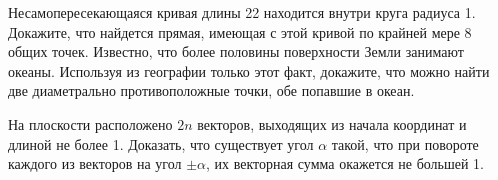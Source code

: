 \begin{problem}
Несамопересекающаяся кривая длины 22 находится внутри круга радиуса 1. Докажите, что найдется прямая, имеющая с этой кривой по крайней мере 8 общих точек.
Известно, что более половины поверхности Земли занимают океаны. Используя из географии только этот факт, докажите, что можно найти две диаметрально противоположные точки, обе попавшие в океан.
\end{problem}

\begin{problem}
На плоскости расположено $2n$ векторов, выходящих из начала координат и длиной не более 1. Доказать, что существует угол $\alpha$ такой, что при повороте каждого из векторов на угол $\pm \alpha$, их векторная сумма окажется не большей 1.  
\end{problem}
